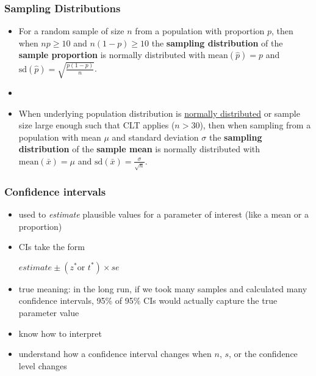 \begin{frame}[label=sampling]
\frametitle{Sampling Distributions}
    \begin{itemize}
        \item
        For a random sample of size $n$ from a population with proportion $p$, then when $np\geq10$ and $n(1-p)\geq10$ the \textbf{sampling distribution} of the \textbf{sample proportion} is normally distributed with $\mbox{mean}(\hat{p})=p$ and $\mbox{sd}(\hat{p})=\sqrt{\frac{p(1-p)}{n}}$.
        \item[]
        \item
        When underlying population distribution is \underline{normally distributed} or sample size large enough such that CLT applies ($n>30$), then when sampling from a population with mean $\mu$ and standard deviation $\sigma$ the \textbf{sampling distribution} of the \textbf{sample mean} is normally distributed with $\mbox{mean}(\bar{x})=\mu$ and $\mbox{sd}(\bar{x})=\frac{\sigma}{\sqrt{n}}$.
    \end{itemize}
    \begin{flushright}
    \hyperlink{topics}{}
    \end{flushright}
\end{frame}

\begin{frame}[label=CIs]
\frametitle{Confidence intervals}
\begin{itemize}
    \item
    used to \emph{estimate} plausible values for a parameter of interest (like a mean or a proportion)
    \item
    CIs take the form
    \begin{center}
    $estimate \pm (z^*\mbox{or } t^*) \times se$
    \end{center}
    \item
    true meaning: in the long run, if we took many samples and calculated many confidence intervals, 95\% of 95\% CIs would actually capture the true parameter value
    \item
    know how to interpret
    \item
    understand how a confidence interval changes when $n$, $s$, or the confidence level changes
\end{itemize}
\begin{flushright}
\hyperlink{topics}{}
\end{flushright}
\end{frame}


